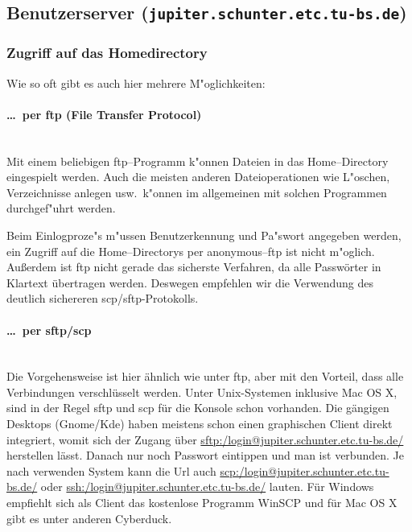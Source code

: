 
\subsection{Benutzerserver (\texttt{jupiter.schunter.etc.tu-bs.de})}
\label{benutzerserver}
\subsubsection{Zugriff auf das Homedirectory}

Wie so oft gibt es auch hier mehrere M"oglichkeiten: 

\paragraph{\dots\ per ftp (File Transfer Protocol)} \ \\
Mit einem beliebigen \glossar ftp--Programm k"onnen Dateien in das
\glossar Home--Directory eingespielt werden. Auch die meisten anderen
Dateioperationen wie L"oschen, Verzeichnisse anlegen usw.\  k"onnen im
allgemeinen mit solchen Programmen durchgef"uhrt werden.

Beim Einlogproze"s m"ussen Benutzerkennung und Pa"swort angegeben werden, ein
Zugriff auf die \glossar Home--Directorys per anonymous--ftp ist nicht
m"oglich. Außerdem ist ftp nicht gerade das sicherste Verfahren, da
alle Passwörter in Klartext übertragen werden. Deswegen empfehlen wir
die Verwendung des deutlich sichereren scp/sftp-Protokolls.
\paragraph{\dots\ per sftp/scp} \ \\
Die Vorgehensweise ist hier ähnlich wie unter ftp, aber mit den
Vorteil, dass alle Verbindungen verschlüsselt werden. Unter
Unix-Systemen inklusive Mac OS X, sind in der Regel sftp und scp für
die Konsole schon vorhanden. Die gängigen Desktops (Gnome/Kde) haben
meistens schon einen graphischen Client direkt integriert, womit sich
der Zugang über \url{sftp:/login@jupiter.schunter.etc.tu-bs.de/}
herstellen lässt. Danach nur noch Passwort eintippen und man ist
verbunden. Je nach verwenden System kann die Url auch
\url{scp:/login@jupiter.schunter.etc.tu-bs.de/} oder
\url{ssh:/login@jupiter.schunter.etc.tu-bs.de/} lauten. 
Für Windows empfiehlt sich als Client das kostenlose Programm WinSCP
und für Mac OS X gibt es unter anderen Cyberduck. 

